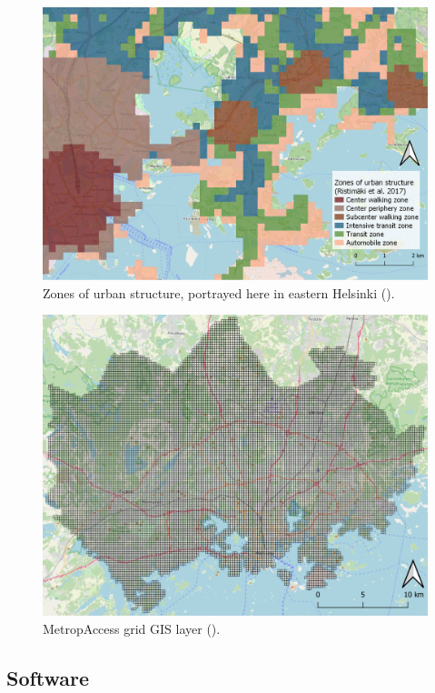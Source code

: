 \begin{figure}[H]%
    \centering
    \includegraphics[width=.88\textwidth]{images/thesis_data_ykr_zones.png}
    \caption[Zones of urban structure in Eastern Helsinki.]{Zones of urban structure, portrayed here in eastern Helsinki (\cite{OpenStreetMap}).}%
    \label{fig:datalayers_ykr}%
\end{figure} 

\begin{figure}[H]%
    \includegraphics[width=\textwidth]{images/thesis_data_grid.png}
    \caption[MetropAccess grid]{MetropAccess grid GIS layer (\cite{OpenStreetMap}).}%
    \label{fig:datalayers_metropaccess_ykr}%
\end{figure}

\subsection{Software}
\justify


